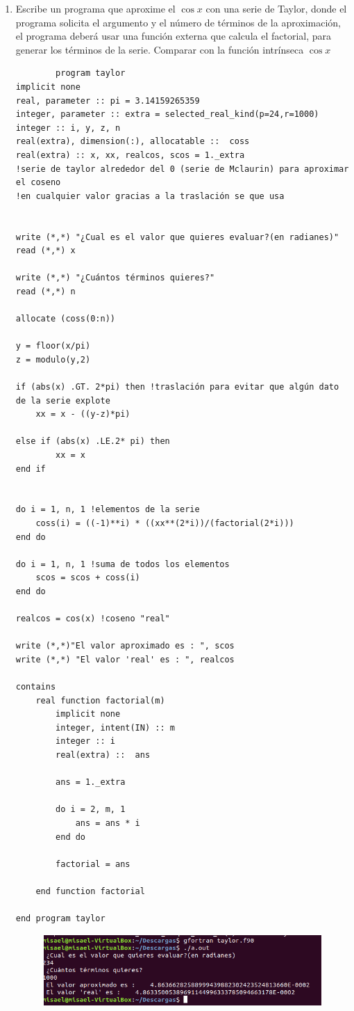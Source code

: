 \documentclass[12pt,a4paper]{article}
\begin{document}
\begin{enumerate}
    \item Escribe un programa que aproxime el $\cos{x}$ con una serie de Taylor, donde el programa solicita el argumento y el número de términos de la aproximación, el programa deberá usar una función externa que calcula el factorial, para generar los términos de la serie. Comparar con la función intrínseca $\cos{x}$
    
    \begin{verbatim}
        program taylor
implicit none
real, parameter :: pi = 3.14159265359
integer, parameter :: extra = selected_real_kind(p=24,r=1000)
integer :: i, y, z, n
real(extra), dimension(:), allocatable ::  coss
real(extra) :: x, xx, realcos, scos = 1._extra
!serie de taylor alrededor del 0 (serie de Mclaurin) para aproximar el coseno
!en cualquier valor gracias a la traslación se que usa


write (*,*) "¿Cual es el valor que quieres evaluar?(en radianes)"
read (*,*) x

write (*,*) "¿Cuántos términos quieres?"
read (*,*) n

allocate (coss(0:n))

y = floor(x/pi)
z = modulo(y,2)

if (abs(x) .GT. 2*pi) then !traslación para evitar que algún dato de la serie explote
	xx = x - ((y-z)*pi)

else if (abs(x) .LE.2* pi) then
		xx = x
end if


do i = 1, n, 1 !elementos de la serie
	coss(i) = ((-1)**i) * ((xx**(2*i))/(factorial(2*i)))
end do

do i = 1, n, 1 !suma de todos los elementos
	scos = scos + coss(i)
end do

realcos = cos(x) !coseno "real"
	
write (*,*)"El valor aproximado es : ", scos
write (*,*) "El valor 'real' es : ", realcos

contains
	real function factorial(m)
		implicit none
		integer, intent(IN) :: m
		integer :: i
		real(extra) ::  ans

		ans = 1._extra

		do i = 2, m, 1
			ans = ans * i
		end do

		factorial = ans

	end function factorial
 	
end program taylor
    \end{verbatim}
    
    \begin{figure}[h!]
        \centering
        \includegraphics[scale=0.9]{1.1.PNG}
    \end{figure}
    

\end{enumerate}
\end{document}
